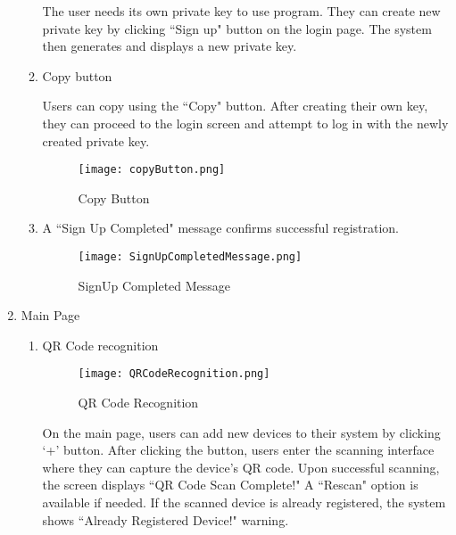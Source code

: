 \documentclass[conference]{IEEEtran}
\begin{document}
\begin{enumerate}[itemsep=2ex, parsep=1ex]
\begin{enumerate}
        The user needs its own private key to use program. They can create new private key by clicking ``Sign up" button on the login page. The system then generates and displays a new private key.
		                  
		\item Copy button

        Users can copy using the ``Copy" button. After creating their own key, they can proceed to the login screen and attempt to log in with the newly created private key.

        \vspace{5cm}

        \begin{figure}[h!]
            \centering
            \texttt{[image: copyButton.png]}
            \caption{Copy Button}
            \label{fig:enter-label}
        \end{figure}
		                  
		\item A ``Sign Up Completed" message confirms successful registration.

        \begin{figure}[h!]
            \centering
            \texttt{[image: SignUpCompletedMessage.png]}
            \caption{SignUp Completed Message}
            \label{fig:enter-label}
        \end{figure}
	\end{enumerate}

    \clearpage
	        
	\item{Main Page}
	\begin{enumerate}
		\item QR Code recognition

        \begin{figure}[h!]
            \centering
            \texttt{[image: QRCodeRecognition.png]}
            \caption{QR Code Recognition}
            \label{fig:enter-label}
        \end{figure}
        
        On the main page, users can add new devices to their system by clicking `+' button. After clicking the button, users enter the scanning interface where they can capture the device's QR code. Upon successful scanning, the screen displays ``QR Code Scan Complete!" A ``Rescan" option is available if needed. If the scanned device is already registered, the system shows ``Already Registered Device!" warning.
		                  

\end{enumerate}
\end{enumerate}
\end{document}
